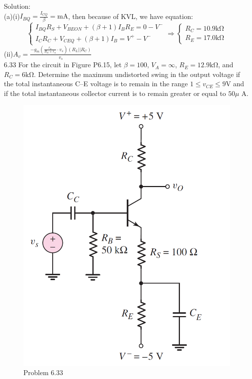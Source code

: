 \documentclass[a4paper,11pt,UTF8]{article}
\begin{document}
\noindent Solution:\\
(a)(i)$\displaystyle I_{BQ}=\frac{I_{CQ}}{\beta}=\mathrm{mA}$, then because of KVL, we have equation:
$$\begin{cases}
	I_{BQ}R_S+V_{BE{ON}}+(\beta+1)I_BR_E=0-V^-\\
	I_CR_C+V_{CEQ}+(\beta+1)I_B=V^+-V^-
\end{cases}\Rightarrow
\begin{cases}
	R_C=10.9\mathrm{k\Omega}\\
	R_E=17.0\mathrm{k\Omega}
\end{cases}
$$
(ii)$\displaystyle A_v=\frac{-g_m(\displaystyle\frac{r_\pi}{R_S+r_\pi}\cdot v_s)(R_L||R_C)}{v_s}$\\
6.33 For the circuit in Figure P6.15, let $\beta = 100$, $V_A =\infty$, $R_E = 12.9 \mathrm{k\Omega}$, and
$R_C = 6 \mathrm{k\Omega}$. Determine the maximum undistorted swing in the output
voltage if the total instantaneous C–E voltage is to remain in the range
$1 \leq v_{CE} \leq 9 $V and if the total instantaneous collector current is to remain
greater or equal to $50 \mu$ A.
\begin{figure}[H] 
	\centering 
	\includegraphics[scale=0.20]{MD6.33.png}
	\caption{Problem 6.33}
\end{figure}
\end{document}
